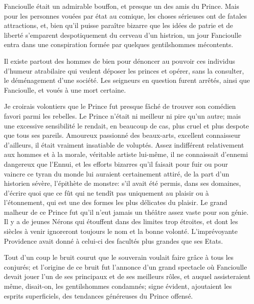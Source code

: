 
Fancioulle était un admirable bouffon, et presque un des amis du Prince.
Mais pour les personnes vouées par état au comique, les choses
sérieuses ont de fatales attractions, et, bien qu’il
puisse paraître bizarre que les idées de patrie et de liberté
s’emparent despotiquement du cerveau
d’un histrion, un jour Fancioulle entra dans une
conspiration formée par quelques gentilshommes mécontents.

Il existe partout des hommes de bien pour dénoncer au pouvoir ces
individus d’humeur atrabilaire qui veulent déposer les
princes et opérer, sans la consulter, le déménagement
d’une société. Les seigneurs en question furent
arrêtés, ainsi que Fancioulle, et voués à une mort certaine.

Je croirais volontiers que le Prince fut presque fâché de trouver son
comédien favori parmi les rebelles. Le Prince n’était
ni meilleur ni pire qu’un autre; mais une excessive
sensibilité le rendait, en beaucoup de cas, plus cruel et plus despote
que tous ses pareils. Amoureux passionné des beaux{}-arts, excellent
connaisseur d’ailleurs, il était vraiment insatiable
de voluptés. Assez indifférent relativement aux hommes et à la morale,
véritable artiste lui{}-même, il ne connaissait
d’ennemi dangereux que l’Ennui, et
les efforts bizarres qu’il faisait pour fuir ou pour
vaincre ce tyran du monde lui auraient certainement attiré, de la part
d’un historien sévère, l’épithète de
monstre: s’il avait été permis, dans ses domaines,
d’écrire quoi que ce fût qui ne tendît pas uniquement
au plaisir ou à l’étonnement, qui est une des formes
les plus délicates du plaisir. Le grand malheur de ce Prince fut
qu’il n’eut jamais un théâtre assez
vaste pour son génie. Il y a de jeunes Nérons qui étouffent dans des
limites trop étroites, et dont les siècles à venir ignoreront toujours
le nom et la bonne volonté. L’imprévoyante Providence
avait donné à celui{}-ci des facultés plus grandes que ses Etats.

Tout d’un coup le bruit courut que le souverain voulait
faire grâce à tous les conjurés; et l’origine de ce
bruit fut l’annonce d’un grand
spectacle où Fancioulle devait jouer l’un de ses
principaux et de ses meilleurs rôles, et auquel assisteraient même,
disait{}-on, les gentilshommes condamnés; signe évident, ajoutaient les
esprits superficiels, des tendances généreuses du Prince offensé.

